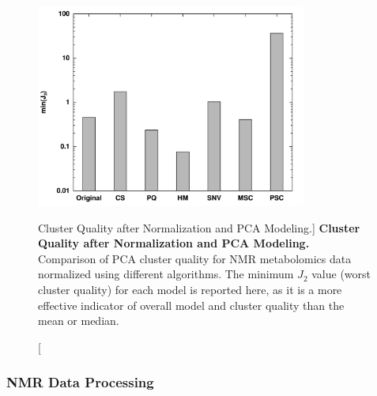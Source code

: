 \begin{figure}
\includegraphics[width=3.5in]{figs/pscorr/01-minj2.png}
\caption
      [Cluster Quality after Normalization and PCA Modeling.]{
  {\bf Cluster Quality after Normalization and PCA Modeling.}
  \\
  Comparison of PCA cluster quality for \hnmr{} NMR metabolomics data
  normalized using different algorithms. The minimum $J_2$ value (worst
  cluster quality) for each model is reported here, as it is a more effective
  indicator of overall model and cluster quality than the mean or median.
}
\end{figure}

\subsubsection{NMR Data Processing}

